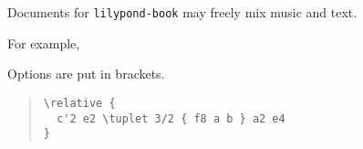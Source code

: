 \documentclass{article}
\begin{document}
Documents for \verb+lilypond-book+ may freely mix music and text.

For example,

{%
\parindent 0pt
\noindent
\ifx\preLilyPondExample \undefined
\else
  \expandafter\preLilyPondExample
\fi
\def\lilypondbook{}%
%
\ifx\postLilyPondExample \undefined
\else
  \expandafter\postLilyPondExample
\fi
}

Options are put in brackets.

\begin{quote}
\noindent
\begin{verbatim}
\relative {
  c'2 e2 \tuplet 3/2 { f8 a b } a2 e4
}
\end{verbatim}
{%
\parindent 0pt
\noindent
\ifx\preLilyPondExample \undefined
\else
  \expandafter\preLilyPondExample
\fi
\def\lilypondbook{}%
%
\ifx\postLilyPondExample \undefined
\else
  \expandafter\postLilyPondExample
\fi
}
\end{quote}
\end{document}
